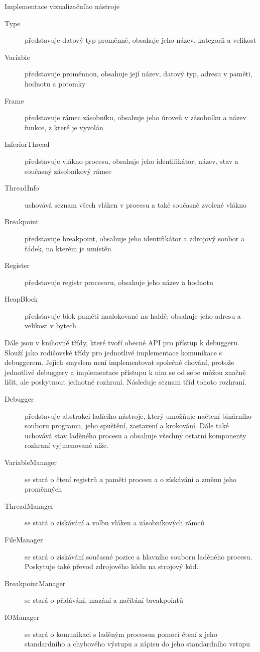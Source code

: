 \documentclass[czech,bachelor,male,python,dept460,hidelinks]{diploma}						%
\newcommand{\parspace}[1][]{
	\ifthenelse{\isempty{#1}}{\vspace{5mm}}{\vspace{#1}}
	\par
}
\begin{document}
\begin{section}{Implementace vizualizačního nástroje}
		\begin{description}
			\item[Type] představuje datový typ proměnné, obsahuje jeho název, kategorii a velikost
			\item[Variable] představuje proměnnou, obsahuje její název, datový typ, adresu v paměti, hodnotu a potomky
			\item[Frame] představuje rámec zásobníku, obsahuje jeho úroveň v zásobníku a název funkce, z které je vyvolán
			\item[InferiorThread] představuje vlákno procesu, obsahuje jeho identifikátor, název, stav a současný zásobníkový rámec
			\item[ThreadInfo] uchovává seznam všech vláken v procesu a také současně zvolené vlákno
			\item[Breakpoint] představuje breakpoint, obsahuje jeho identifikátor a zdrojový soubor a řádek, na kterém je umístěn
			\item[Register] představuje registr procesoru, obsahuje jeho název a hodnotu
			\item[HeapBlock] představuje blok paměti naalokované na haldě, obsahuje jeho adresu a velikost v bytech
		\end{description}
		
		\parspace Dále jsou v knihovně třídy, které tvoří obecné API pro přístup k debuggeru. Slouží jako rodičovské třídy pro jednotlivé implementace
		komunikace s debuggerem. Jejich smyslem není implementovat společné chování, protože jednotlivé debuggery a implementace přístupu k nim
		se od sebe můžou značně lišit, ale poskytnout jednotné rozhraní. Následuje seznam tříd tohoto rozhraní.
		
		\begin{description}
			\item[Debugger] představuje abstrakci ladícího nástroje, který umožňuje načtení binárního souboru programu, jeho spuštění, zastavení
			a krokování. Dále také uchovává stav laděného procesu a obsahuje všechny ostatní komponenty rozhraní vyjmenované níže.
			\item[VariableManager] se stará o čtení registrů a paměti procesu a o získávání a změnu jeho proměnných
			\item[ThreadManager] se stará o získávání a volbu vláken a zásobníkových rámců
			\item[FileManager] se stará o získávání současné pozice a hlavního souboru laděného procesu. Poskytuje také převod zdrojového kódu
			na strojový kód.
			\item[BreakpointManager] se stará o přidávání, mazání a načítání breakpointů
			\item[IOManager] se stará o komunikaci s laděným procesem pomocí čtení z jeho standardního a chybového výstupu a zápisu do jeho standardního vstupu
		\end{description}
		

\end{section}
\end{document}
